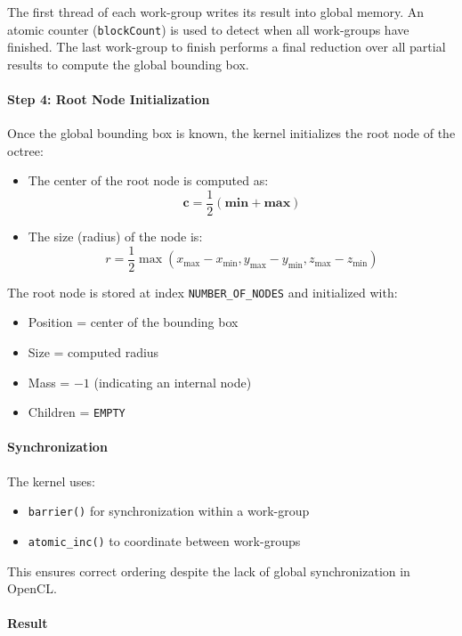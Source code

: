 \documentclass[12pt]{article}
\begin{document}
The first thread of each work-group writes its result into global memory.
An atomic counter (\texttt{blockCount}) is used to detect when all work-groups have finished.
The last work-group to finish performs a final reduction over all partial results to compute the global bounding box.

\paragraph{Step 4: Root Node Initialization}

Once the global bounding box is known, the kernel initializes the root node of the octree:

\begin{itemize}
    \item The center of the root node is computed as:
    \[
    \mathbf{c} = \frac{1}{2} (\mathbf{min} + \mathbf{max})
    \]
    
    \item The size (radius) of the node is:
    \[
    r = \frac{1}{2} \max \left(
        x_{\max} - x_{\min},
        y_{\max} - y_{\min},
        z_{\max} - z_{\min}
    \right)
    \]
\end{itemize}

The root node is stored at index \texttt{NUMBER\_OF\_NODES} and initialized with:
\begin{itemize}
    \item Position = center of the bounding box
    \item Size = computed radius
    \item Mass = $-1$ (indicating an internal node)
    \item Children = \texttt{EMPTY}
\end{itemize}

\paragraph{Synchronization}

The kernel uses:
\begin{itemize}
    \item \texttt{barrier()} for synchronization within a work-group
    \item \texttt{atomic\_inc()} to coordinate between work-groups
\end{itemize}

This ensures correct ordering despite the lack of global synchronization in OpenCL.

\paragraph{Result}
\end{document}
